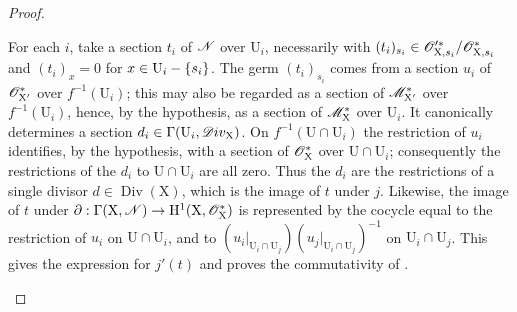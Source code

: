 \begin{proof}
\begin{enumerate}[label=(\roman*)]
For each $i$, take a section $t_i$ of $\mathscr{N}$ over $\mathrm{U}_i$, necessarily with $(t_i)_{s_i}\in\mathscr{O}'^{*}_{\mathrm{X},s_i}/\mathscr{O}^*_{\mathrm{X},s_i}$ and $(t_i)_x=0$ for $x\in\mathrm{U}_i-\{s_i\}$.
The germ $(t_i)_{s_i}$ comes from a section $u_i$ of $\mathscr{O}^*_{\mathrm{X}'}$ over $f^{-1}(\mathrm{U}_i)$; this may also be regarded as a section of $\mathscr{M}^*_{\mathrm{X}'}$ over $f^{-1}(\mathrm{U}_i)$, hence, by the hypothesis, as a section of $\mathscr{M}^*_{\mathrm{X}}$ over $\mathrm{U}_i$.
It canonically determines a section $d_i\in\Gamma(\mathrm{U}_i,\mathscr{D}iv_\mathrm{X})$.
On $f^{-1}(\mathrm{U}\cap\mathrm{U}_i)$ the restriction of $u_i$ identifies, by the hypothesis, with a section of $\mathscr{O}^*_{\mathrm{X}}$ over $\mathrm{U}\cap\mathrm{U}_i$; consequently the restrictions of the $d_i$ to $\mathrm{U}\cap\mathrm{U}_i$ are all zero.
Thus the $d_i$ are the restrictions of a single divisor $d\in\operatorname{Div}(\mathrm{X})$, which is the image of $t$ under $j$.
Likewise, the image of $t$ under $\partial:\Gamma(\mathrm{X},\mathscr{N})\to\mathrm{H}^1(\mathrm{X},\mathscr{O}^*_{\mathrm{X}})$ is represented by the cocycle equal to the restriction of $u_i$ on $\mathrm{U}\cap\mathrm{U}_i$, and to
$(u_i|_{\mathrm{U}_i\cap\mathrm{U}_j})(u_j|_{\mathrm{U}_i\cap\mathrm{U}_j})^{-1}$ on $\mathrm{U}_i\cap\mathrm{U}_j$.
This gives the expression for $j'(t)$ and proves the commutativity of .
\end{enumerate}
\end{proof}

